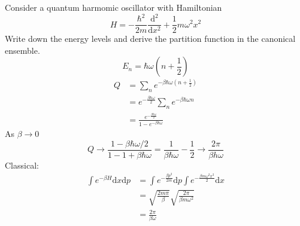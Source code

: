 \documentclass[letterpaper]{article}
\def\d{\mathrm{d}}
\begin{document}
\begin{multicols}{2}
Consider a quantum harmomic oscillator with Hamiltonian
\[
H=-\frac{\hbar^2}{2m}\frac{\d^2}{\d x^2}+\frac{1}{2}m\omega^2x^2
\]
Write down the energy levels and derive the partition function in the canonical
ensemble.
\[
E_n=\hbar\omega\left(n+\frac{1}{2}\right)
\]
\begin{align*}
Q&=\sum_ne^{-\beta\hbar\omega\left(n+\frac{1}{2}\right)}\\
&=e^{-\frac{\beta\hbar\omega}{2}}\sum_ne^{-\beta\hbar\omega n}\\
&=\frac{e^{-\frac{\beta\hbar\omega}{2}}}
{1-e^{-\beta\hbar\omega}}
\end{align*}
As $\beta\rightarrow0$
\[
Q\rightarrow\frac{1-\beta\hbar\omega/2}{1-1+\beta\hbar\omega}
=\frac{1}{\beta\hbar\omega}-\frac{1}{2}\rightarrow\frac{2\pi}{\beta h\omega}
\]
Classical:
\begin{align*}
\int e^{-\beta H}\d x\d p&=\int e^{-\frac{\beta p^2}{2m}}\d p
\int e^{-\frac{\beta m\omega^2x^2}{2}}\d x\\
&=\sqrt{\frac{2m\pi}{\beta}}\sqrt{\frac{2\pi}{\beta m\omega^2}}\\
&=\frac{2\pi}{\beta\omega}
\end{align*}


\end{multicols}
\end{document}
